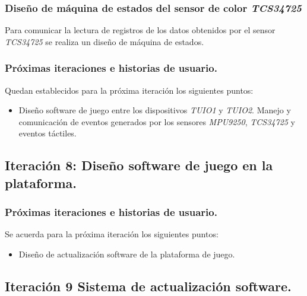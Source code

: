 \subsubsection{Diseño de máquina de estados del sensor de color \emph{TCS34725}}
Para comunicar la lectura de registros de los datos obtenidos por el sensor \emph{TCS34725} se realiza un diseño de máquina de estados.

\subsubsection{Próximas iteraciones e historias de usuario.}
Quedan establecidos para la próxima iteración los siguientes puntos:
\begin{itemize}
\item Diseño software de juego entre los dispositivos \emph{TUIO1} y \emph{TUIO2}. Manejo y comunicación de eventos generados por los sensores \emph{MPU9250}, \emph{TCS34725} y eventos táctiles.
\end{itemize}

\subsection{Iteración 8: Diseño software de juego en la plataforma.}
\subsubsection{Próximas iteraciones e historias de usuario.}
Se acuerda para la próxima iteración los siguientes puntos:
\begin{itemize}
\item Diseño de actualización software de la plataforma de juego.
\end{itemize}
\subsection{Iteración 9 Sistema de actualización software.}
